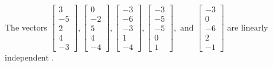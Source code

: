 \begin{exercise}
\begin{exerciseStatement}
  \end{exerciseStatement}
  \begin{exerciseAnswer}
   The vectors \(\left[\begin{array}{r}
3 \\
-5 \\
2 \\
4 \\
-3
\end{array}\right] , \left[\begin{array}{r}
0 \\
-2 \\
5 \\
4 \\
-4
\end{array}\right] , \left[\begin{array}{r}
-3 \\
-6 \\
-3 \\
1 \\
-4
\end{array}\right] , \left[\begin{array}{r}
-3 \\
-5 \\
-5 \\
0 \\
1
\end{array}\right] , \text{ and } \left[\begin{array}{r}
-3 \\
0 \\
-6 \\
2 \\
-1
\end{array}\right]\) are 
  	 linearly independent  .
  


  \end{exerciseAnswer}
\end{exercise}